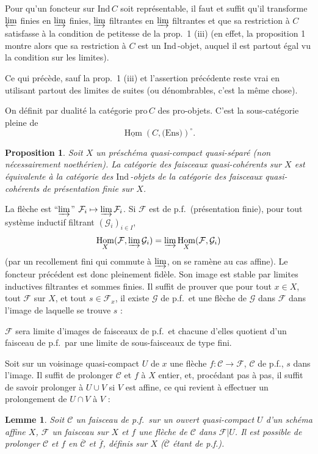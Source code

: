 \documentclass[12pt]{amsart}
\theoremstyle{plain}
\newtheorem{prop}{Proposition}
\newtheorem{lem}{Lemme}
\theoremstyle{definition}
\DeclareMathOperator{\Hom}{Hom}
\newcommand{\Ind}{\text{Ind}\,}
\newcommand{\Pro}{\text{pro}\,}
\newcommand{\cF}{\mathcal{F}}
\newcommand{\cG}{\mathcal{G}}
\newcommand{\cC}{\mathcal{C}}
\begin{document}
Pour qu'un foncteur sur $\Ind C$ soit repr\'esentable, il faut et suffit qu'il transforme $\varprojlim$ finies en $\varinjlim$ finies, $\varinjlim$ filtrantes en $\varinjlim$ filtrantes et que sa restriction \`a $C$ satisfasse \`a la condition de petitesse de la prop.\ 1 (iii) (en effet, la proposition 1 montre alors que sa restriction \`a $C$ est un $\Ind$-objet, auquel il est partout \'egal vu la condition sur les limites).

Ce qui pr\'ec\`ede, sauf la prop.\ 1 (iii) et l'assertion pr\'ec\'edente reste vrai en utilisant partout des limites de suites (ou d\'enombrables, c'est la m\^eme chose).

On d\'efinit par dualit\'e la cat\'egorie $\Pro C$ des pro-objets. C'est la sous-cat\'egorie pleine de
\[
\underline{\Hom}(C,\text{(Ens)})^{\circ}.
\]

\begin{prop}
Soit $X$ un pr\'esch\'ema quasi-compact quasi-s\'epar\'e (non n\'ecessairement noeth\'erien). La cat\'egorie des faisceaux quasi-coh\'erents sur $X$ est \'equivalente \`a la cat\'egorie des $\Ind$-objets de la cat\'egorie des faisceaux quasi-coh\'erents de pr\'esentation finie sur $X$.
\end{prop}

La fl\`eche est ``$\varinjlim$'' $\cF_{i} \mapsto \varinjlim \cF_{i}$. Si $\cF$ est de p.f.\ (pr\'esentation finie), pour tout syst\`eme inductif filtrant $(\cG_{i})_{i \in I}$,
\[
\Hom_{X}(\cF, \varinjlim \cG_{i}) = \varinjlim \Hom_{X}(\cF, \cG_{i})
\]
(par un recollement fini qui commute \`a $\varinjlim$, on se ram\`ene au cas affine). Le foncteur pr\'ec\'edent est donc pleinement fid\`ele. Son image est stable par limites inductives filtrantes et sommes finies. Il suffit de prouver que pour tout $x \in X$, tout $\cF$ sur $X$, et tout $s \in \cF_{x}$, il existe $\cG$ de p.f.\ et une fl\`eche de $\cG$ dans $\cF$ dans l'image de laquelle se trouve $s$ :

$\cF$ sera limite d'images de faisceaux de p.f.\ et chacune d'elles quotient d'un faisceau de p.f.\ par une limite de sous-faisceaux de type fini.

Soit sur un voisinage quasi-compact $U$ de $x$ une fl\`eche $f: \cC \to \cF$, $\cC$ de p.f., $s$ dans l'image. Il suffit de prolonger $\cC$ et $f$ \`a $X$ entier, et, proc\'edant pas \`a pas, il suffit de savoir prolonger \`a $U \cup V$ si $V$ est affine, ce qui revient \`a effectuer un prolongement de $U \cap V$ \`a $V$ :

\begin{lem}
Soit $\cC$ un faisceau de p.f.\ sur un ouvert quasi-compact $U$ d'un sch\'ema affine $X$, $\cF$ un faisceau sur $X$ et $f$ une fl\`eche de $\cC$ dans $\cF|U$. Il est possible de prolonger $\cC$ et $f$ en $\overline{\cC}$ et $\overline{f}$, d\'efinis sur $X$ ($\overline{\cC}$ \'etant de p.f.).
\end{lem}
\end{document}
